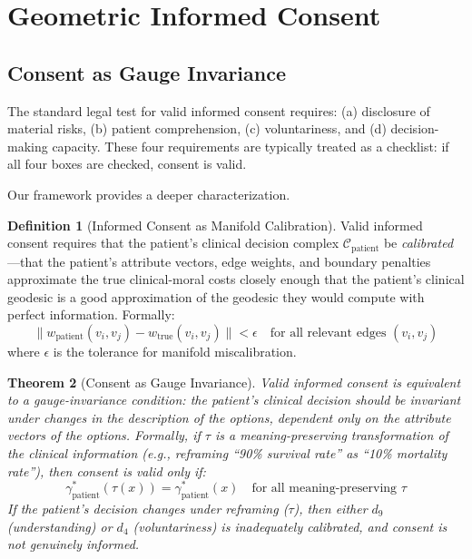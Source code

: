 \documentclass[12pt]{article}
\newtheorem{theorem}{Theorem}[section]
\theoremstyle{definition}
\newtheorem{definition}[theorem]{Definition}
\theoremstyle{remark}
\newcommand{\C}{\mathcal{C}}               %
\begin{document}
\section{Geometric Informed Consent}
\label{sec:consent}

\subsection{Consent as Gauge Invariance}

The standard legal test for valid informed consent requires: (a) disclosure of material risks, (b) patient comprehension, (c) voluntariness, and (d) decision-making capacity.  These four requirements are typically treated as a checklist: if all four boxes are checked, consent is valid.

Our framework provides a deeper characterization.

\begin{definition}[Informed Consent as Manifold Calibration]
\label{def:consent_calibration}
Valid informed consent requires that the patient's clinical decision complex $\C_{\text{patient}}$ be \emph{calibrated}---that the patient's attribute vectors, edge weights, and boundary penalties approximate the true clinical-moral costs closely enough that the patient's clinical geodesic is a good approximation of the geodesic they would compute with perfect information.  Formally:
\begin{equation}
\|w_{\text{patient}}(v_i, v_j) - w_{\text{true}}(v_i, v_j)\| < \epsilon \quad \text{for all relevant edges } (v_i, v_j)
\label{eq:consent_calibration}
\end{equation}
where $\epsilon$ is the tolerance for manifold miscalibration.
\end{definition}

\begin{theorem}[Consent as Gauge Invariance]
\label{thm:consent_gauge}
Valid informed consent is equivalent to a \emph{gauge-invariance condition}: the patient's clinical decision should be invariant under changes in the \emph{description} of the options, dependent only on the \emph{attribute vectors} of the options.  Formally, if $\tau$ is a meaning-preserving transformation of the clinical information (e.g., reframing ``90\% survival rate'' as ``10\% mortality rate''), then consent is valid only if:
\begin{equation}
\gamma^*_{\text{patient}}(\tau(x)) = \gamma^*_{\text{patient}}(x) \quad \text{for all meaning-preserving } \tau
\end{equation}
If the patient's decision changes under reframing ($\tau$), then either $d_9$ (understanding) or $d_4$ (voluntariness) is inadequately calibrated, and consent is not genuinely informed.
\end{theorem}
\end{document}
